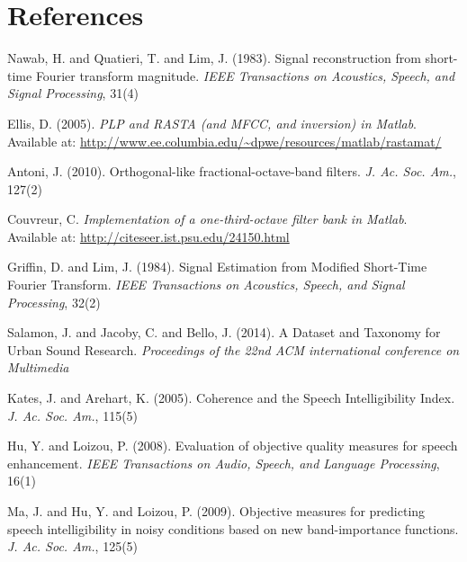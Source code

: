 \documentclass[final,3p,times,twocolumn]{elsarticle}
\begin{document}
\section{References}
\begin{thebibliography}{09}

Nawab, H. and Quatieri, T. and Lim, J. (1983). Signal reconstruction from short-time Fourier transform magnitude. \textit{IEEE Transactions on Acoustics, Speech, and Signal Processing}, 31(4)

Ellis, D. (2005). \textit{{PLP} and {RASTA} (and {MFCC}, and inversion) in {M}atlab}. Available at: \url{http://www.ee.columbia.edu/~dpwe/resources/matlab/rastamat/}

Antoni, J. (2010). Orthogonal-like fractional-octave-band filters. \textit{J. Ac. Soc. Am.}, 127(2)

Couvreur, C. \textit{Implementation of a one-third-octave filter bank in Matlab}. Available at: \url{http://citeseer.ist.psu.edu/24150.html}

Griffin, D. and Lim, J. (1984). Signal Estimation from Modified Short-Time Fourier Transform. \textit{IEEE Transactions on Acoustics, Speech, and Signal Processing}, 32(2)

Salamon, J. and Jacoby, C. and Bello, J. (2014). A Dataset and Taxonomy for Urban Sound Research. \textit{Proceedings of the 22nd ACM international conference on Multimedia}

Kates, J. and Arehart, K. (2005). Coherence and the Speech Intelligibility Index. \textit{J. Ac. Soc. Am.}, 115(5)

Hu, Y. and Loizou, P. (2008). Evaluation of objective quality measures for speech enhancement. \textit{IEEE Transactions on Audio, Speech, and Language Processing}, 16(1)

Ma, J. and Hu, Y. and Loizou, P. (2009). Objective measures for predicting speech intelligibility in noisy conditions based on new band-importance functions. \textit{J. Ac. Soc. Am.}, 125(5)


\end{thebibliography}
\end{document}
